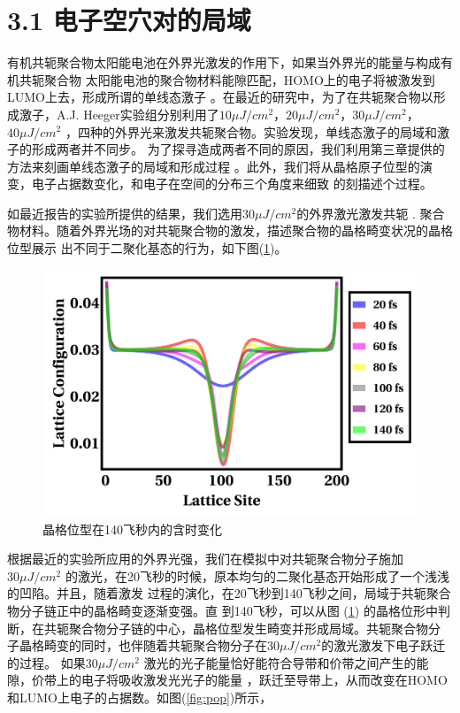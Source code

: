 \documentclass[12pt,]{report}
\begin{document}
\section{3.1
电子空穴对的局域}\label{ux7535ux5b50ux7a7aux7a74ux5bf9ux7684ux5c40ux57df}

有机共轭聚合物太阳能电池在外界光激发的作用下，如果当外界光的能量与构成有机共轭聚合物
太阳能电池的聚合物材料能隙匹配，HOMO上的电子将被激发到LUMO上去，形成所谓的单线态激子
。在最近的研究中，为了在共轭聚合物以形成激子，A.J.
Heeger实验组分别利用了\(10\mu J/cm^2\)，\(20\mu J/cm^2\)，\(30\mu J/cm^2\)，\(40\mu J/cm^2\)
，四种的外界光来激发共轭聚合物。实验发现，单线态激子的局域和激子的形成两者并不同步。
为了探寻造成两者不同的原因，我们利用第三章提供的方法来刻画单线态激子的局域和形成过程
。此外，我们将从晶格原子位型的演变，电子占据数变化，和电子在空间的分布三个角度来细致
的刻描述个过程。

如最近报告的实验所提供的结果，我们选用\(30\mu J/cm^2\)的外界激光激发共轭
.
聚合物材料。随着外界光场的对共轭聚合物的激发，描述聚合物的晶格畸变状况的晶格位型展示
出不同于二聚化基态的行为，如下图(\ref{fig:evo_config})。

\begin{figure}[h!] 
    \centering
    \includegraphics[scale=1]{./figures/Exciton_Figure_3.png}
    \caption{晶格位型在140飞秒内的含时变化}
    \label{fig:evo_config}
\end{figure}

根据最近的实验所应用的外界光强，我们在模拟中对共轭聚合物分子施加\(30\mu J/cm^2\)
的激光，在20飞秒的时候，原本均匀的二聚化基态开始形成了一个浅浅的凹陷。并且，随着激发
过程的演化，在20飞秒到140飞秒之间，局域于共轭聚合物分子链正中的晶格畸变逐渐变强。直
到140飞秒，可以从图 (\ref{fig:evo_config})
的晶格位形中判断，在共轭聚合物分子链的中心，晶格位型发生畸变并形成局域。共轭聚合物分
子晶格畸变的同时，也伴随着共轭聚合物分子在\(30\mu J/cm^2\)的激光激发下电子跃迁的过程。
如果\(30\mu J/cm^2\)
激光的光子能量恰好能符合导带和价带之间产生的能隙，价带上的电子将吸收激发光光子的能量
，跃迁至导带上，从而改变在HOMO和LUMO上电子的占据数。如图(\ref{fig:pop})所示，
\end{document}
